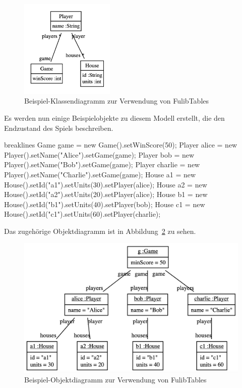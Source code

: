 \begin{figure}
    \centering
    \includegraphics[width=0.4\textwidth]{chapter/pattern-matching/img/game-class-diagram.png}
    \caption{Beispiel-Klassendiagramm zur Verwendung von FulibTables}
    \label{fig:game-class-diagram}
\end{figure}

Es werden nun einige Beispielobjekte zu diesem Modell erstellt, die den Endzustand des Spiels beschreiben.

\begin{jcodeblock*}{breaklines}
    Game game = new Game().setWinScore(50);
    Player alice = new Player().setName("Alice").setGame(game);
    Player bob = new Player().setName("Bob").setGame(game);
    Player charlie = new Player().setName("Charlie").setGame(game);
    House a1 = new House().setId("a1").setUnits(30).setPlayer(alice);
    House a2 = new House().setId("a2").setUnits(20).setPlayer(alice);
    House b1 = new House().setId("b1").setUnits(40).setPlayer(bob);
    House c1 = new House().setId("c1").setUnits(60).setPlayer(charlie);
\end{jcodeblock*}

Das zugehörige Objektdiagramm ist in Abbildung~\ref{fig:game-object-diagram} zu sehen.

\begin{figure}
    \includegraphics[width=\textwidth]{chapter/pattern-matching/img/game-object-diagram.png}
    \caption{Beispiel-Objektdiagramm zur Verwendung von FulibTables}
    \label{fig:game-object-diagram}
\end{figure}

